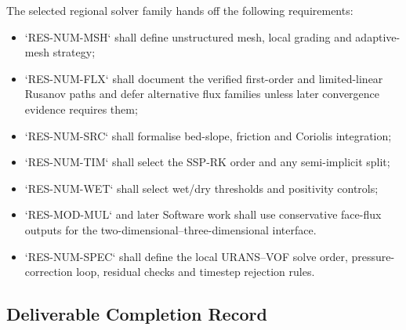 The selected regional solver family hands off the following
requirements:

\begin{itemize}
  \item `RES-NUM-MSH` shall define unstructured mesh, local grading and
    adaptive-mesh strategy;
  \item `RES-NUM-FLX` shall document the verified first-order and
    limited-linear Rusanov paths and defer alternative flux families
    unless later convergence evidence requires them;
  \item `RES-NUM-SRC` shall formalise bed-slope, friction and Coriolis
    integration;
  \item `RES-NUM-TIM` shall select the SSP-RK order and any
    semi-implicit split;
  \item `RES-NUM-WET` shall select wet/dry thresholds and positivity
    controls;
  \item `RES-MOD-MUL` and later Software work shall use conservative
    face-flux outputs for the two-dimensional--three-dimensional
    interface.
  \item `RES-NUM-SPEC` shall define the local URANS--VOF solve order,
    pressure-correction loop, residual checks and timestep rejection
    rules.
\end{itemize}

\subsection{Deliverable Completion Record}
\label{sec:res-num-frm-completion-record}

%
%
%
